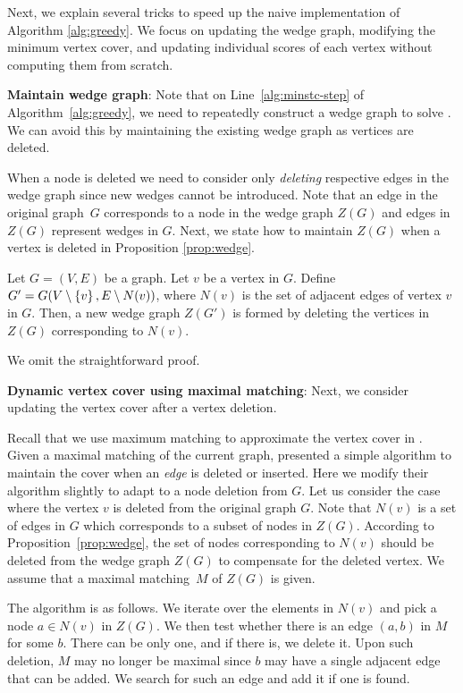 Next, we explain several tricks to speed up the naive implementation of Algorithm \ref{alg:greedy}. 
We focus on updating the wedge graph, modifying the minimum vertex cover, and updating individual scores of each vertex without computing them from scratch.

\textbf{Maintain wedge graph}: Note that on Line~\ref{alg:minstc-step} of Algorithm~\ref{alg:greedy}, we need to repeatedly construct a wedge graph to solve \prbminSTC.
We can avoid this by maintaining the existing wedge graph as vertices are deleted.


When a node is deleted we need to consider only {\em deleting} respective edges in the wedge graph since new wedges cannot be introduced. Note that an edge in the original graph~$G$ corresponds to a node in the wedge graph $Z(G)$ and edges in $Z(G)$ represent wedges in $G$. Next, we state how to maintain $Z(G)$ when a vertex is deleted in Proposition \ref{prop:wedge}.

\begin{proposition}
\label{prop:wedge}
Let $G = (V, E)$ be a graph.
Let $v$ be a vertex in $G$. Define $G' = G(V \setminus \left\{v\right\}, E \setminus N(v))$, where $N(v)$ is the set of adjacent edges of vertex $v$ in $G$.
Then, a new wedge graph $Z(G')$ is formed by deleting the vertices in $Z(G)$ corresponding to $N(v)$. 
\end{proposition}
We omit the straightforward proof.

 

\textbf{Dynamic vertex cover using maximal matching}:
Next, we consider updating the vertex cover after a vertex deletion. 

Recall that we use maximum matching to approximate the vertex cover in \algminstc.
Given a maximal matching of the current graph, \citet{ivkovic1993fully} presented a simple algorithm to maintain the cover when an {\em edge} is deleted or inserted. Here we modify their algorithm slightly to adapt to a node deletion from $G$. 
Let us consider the case where the vertex $v$ is deleted from the original graph $G$. 
Note that $N(v)$ is a set of edges in $G$ which corresponds to a subset of nodes in $Z(G)$.
According to Proposition~\ref{prop:wedge},
the set of nodes corresponding to $N(v)$ should be deleted from the wedge graph $Z(G)$ to compensate for the deleted vertex. We assume that a maximal matching~$M$ of $Z(G)$ is given.


The algorithm is as follows.
We iterate over the elements in $N(v)$ and pick a node $a \in N(v)$ in $Z(G)$. We then test whether there is an edge $(a, b)$ in $M$ for some $b$. There can be only one, and if there is, we delete it. Upon such deletion, $M$ may no longer be maximal since $b$ may have a single adjacent edge that can be added. We search for such an edge and add it if one is found. 

